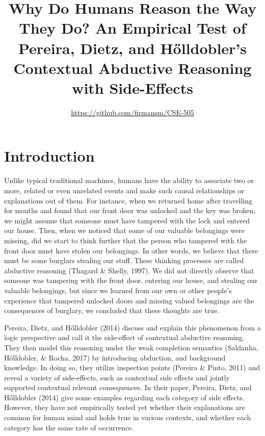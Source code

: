 \documentclass[]{interact}
\theoremstyle{plain}%
\theoremstyle{definition}
\theoremstyle{remark}
\begin{document}

\title{Why Do Humans Reason the Way They Do? An Empirical Test of Pereira, Dietz, and Hőlldobler's Contextual Abductive Reasoning with Side-Effects}

\author{
\url{https://github.com/firmansm/CSE-505}
}

\maketitle

\section{Introduction}

Unlike typical traditional machines, humans have the ability to associate two or more, related or even unrelated events and make such causal relationships or explanations out of them. For instance, when we returned home after travelling for months and found that our front door was unlocked and the key was broken, we might assume that someone must have tampered with the lock and entered our house. Then, when we noticed that some of our valuable belongings were missing, did we start to think further that the person who tampered with the front door must have stolen our belongings. In other words, we believe that there must be some burglars stealing our stuff. These thinking processes are called abductive reasoning (Thagard \& Shelly, 1997). We did not directly observe that someone was tampering with the front door, entering our house, and stealing our valuable belongings, but since we learned from our own or other people’s experience that tampered unlocked doors and missing valued belongings are the consequences of  burglary, we concluded that these thoughts are true. 

Pereira, Dietz, and Hőlldobler (2014) discuss and explain this phenomenon from a logic perspective and call it the side-effect of contextual abductive reasoning. They then model this reasoning under the weak completion semantics (Saldanha, Hölldobler, \& Rocha, 2017) by introducing abduction, and background knowledge. In doing so, they utilize inspection points (Pereira & Pinto, 2011) and reveal a variety of side-effects, such as contextual side effects and jointly supported contextual relevant consequences. In their paper, Pereira, Dietz, and Hőlldobler (2014) give some examples regarding each category of side effects. However, they have not empirically tested yet whether their explanations are common for human mind and holds true in various contexts, and whether each category has the same rate of occurrence.
\end{document}

